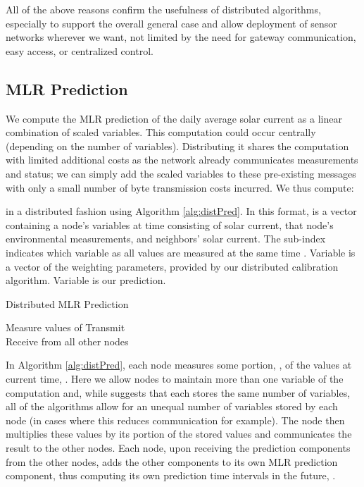 \documentclass[prodmode,acmtosn]{acmsmall}
\begin{document}
All of the above reasons confirm  the usefulness of distributed algorithms, especially to support the overall general case and allow deployment of sensor networks wherever we want, not limited by the need for gateway communication, easy access, or centralized control.

\subsection{MLR Prediction}
We compute the MLR prediction of the daily average solar current as a linear combination of scaled variables.
This computation could occur centrally (depending on the number of variables).
Distributing it shares the computation with limited additional costs as the network already communicates measurements and status; we can simply add the scaled variables to these pre-existing messages with only a small number of byte transmission costs incurred.
We thus compute:

in a distributed fashion using Algorithm \ref{alg:distPred}.
In this format,  is a vector containing a node's variables at time  consisting of solar current, that node's environmental measurements, and neighbors' solar current.
The sub-index  indicates which variable as all  values are measured at the same time .
Variable  is a vector of the weighting parameters, provided by our distributed calibration algorithm.
Variable  is our prediction.

\begin{algorithm}
\caption{Distributed MLR Prediction}\label{alg:distPred}
\begin{algorithmic}[1]
\State Measure  values of 
\State 
\State Transmit  \\
\State Receive from all other nodes 
\State 
\EndFor
\end{algorithmic}
\end{algorithm}

In Algorithm \ref{alg:distPred}, each node measures some portion, , of the  values at current time, .
Here we allow nodes to maintain more than one variable of the computation and, while  suggests that each stores the same number of variables, all of the algorithms allow for an unequal number of variables stored by each node (in cases where this reduces communication for example).
The node then multiplies these  values by its portion of the stored  values and communicates the result to the other nodes.
Each node, upon receiving the prediction components from the other nodes, adds the other components to its own MLR prediction component, thus computing its own prediction  time intervals in the future, .
\end{document}
